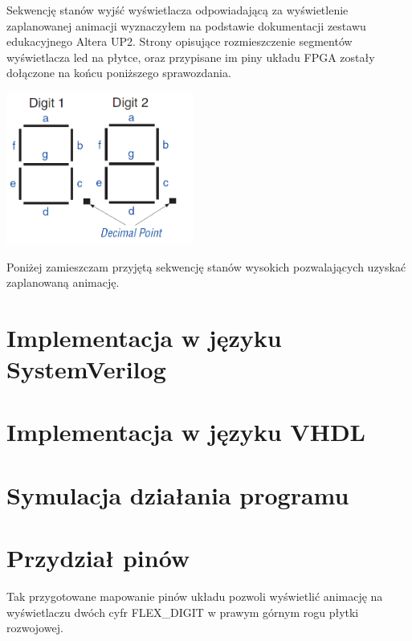 \documentclass{article}
\begin{document}
        Sekwencję stanów wyjść wyświetlacza odpowiadającą za wyświetlenie zaplanowanej animacji wyznaczyłem na podstawie dokumentacji zestawu edukacyjnego Altera UP2. Strony opisujące rozmieszczenie segmentów wyświetlacza led na płytce, oraz przypisane im piny układu FPGA zostały dołączone na końcu poniższego sprawozdania.
        \begin{center}
            \includegraphics[height=5cm]{reports/img/7seg.png}\\
        \end{center}
        Poniżej zamieszczam przyjętą sekwencję stanów wysokich pozwalających uzyskać zaplanowaną animację.
    
    \section{Implementacja w języku SystemVerilog}
        
    
    \section{Implementacja w języku VHDL}
        
    
    
    \section{Symulacja działania programu}
    
    \section{Przydział pinów}
        
        Tak przygotowane mapowanie pinów układu pozwoli wyświetlić animację na wyświetlaczu dwóch cyfr FLEX\_DIGIT w prawym górnym rogu płytki rozwojowej. 
    
      
      
    
    
\end{document}
